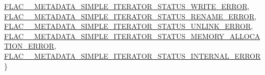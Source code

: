 \begin{DoxyCompactItemize}
\newline
\hyperlink{group__flac__metadata__level1_ggac926e7d2773a05066115cac9048bbec9ac2337299c2347ca311caeaa7d71d857c}{F\+L\+A\+C\+\_\+\+\_\+\+M\+E\+T\+A\+D\+A\+T\+A\+\_\+\+S\+I\+M\+P\+L\+E\+\_\+\+I\+T\+E\+R\+A\+T\+O\+R\+\_\+\+S\+T\+A\+T\+U\+S\+\_\+\+W\+R\+I\+T\+E\+\_\+\+E\+R\+R\+OR}, 
\hyperlink{group__flac__metadata__level1_ggac926e7d2773a05066115cac9048bbec9a2e073843fa99419d76a0b210da96ceb6}{F\+L\+A\+C\+\_\+\+\_\+\+M\+E\+T\+A\+D\+A\+T\+A\+\_\+\+S\+I\+M\+P\+L\+E\+\_\+\+I\+T\+E\+R\+A\+T\+O\+R\+\_\+\+S\+T\+A\+T\+U\+S\+\_\+\+R\+E\+N\+A\+M\+E\+\_\+\+E\+R\+R\+OR}, 
\hyperlink{group__flac__metadata__level1_ggac926e7d2773a05066115cac9048bbec9a4f855433038c576da127fc1de9d18f9b}{F\+L\+A\+C\+\_\+\+\_\+\+M\+E\+T\+A\+D\+A\+T\+A\+\_\+\+S\+I\+M\+P\+L\+E\+\_\+\+I\+T\+E\+R\+A\+T\+O\+R\+\_\+\+S\+T\+A\+T\+U\+S\+\_\+\+U\+N\+L\+I\+N\+K\+\_\+\+E\+R\+R\+OR}, 
\hyperlink{group__flac__metadata__level1_ggac926e7d2773a05066115cac9048bbec9aa8386ed0a20d7e91b0022d203ec3cdec}{F\+L\+A\+C\+\_\+\+\_\+\+M\+E\+T\+A\+D\+A\+T\+A\+\_\+\+S\+I\+M\+P\+L\+E\+\_\+\+I\+T\+E\+R\+A\+T\+O\+R\+\_\+\+S\+T\+A\+T\+U\+S\+\_\+\+M\+E\+M\+O\+R\+Y\+\_\+\+A\+L\+L\+O\+C\+A\+T\+I\+O\+N\+\_\+\+E\+R\+R\+OR}, 
\newline
\hyperlink{group__flac__metadata__level1_ggac926e7d2773a05066115cac9048bbec9a9d821ae65a1c5de619daa88c850906df}{F\+L\+A\+C\+\_\+\+\_\+\+M\+E\+T\+A\+D\+A\+T\+A\+\_\+\+S\+I\+M\+P\+L\+E\+\_\+\+I\+T\+E\+R\+A\+T\+O\+R\+\_\+\+S\+T\+A\+T\+U\+S\+\_\+\+I\+N\+T\+E\+R\+N\+A\+L\+\_\+\+E\+R\+R\+OR}
 \}
\end{DoxyCompactItemize}
